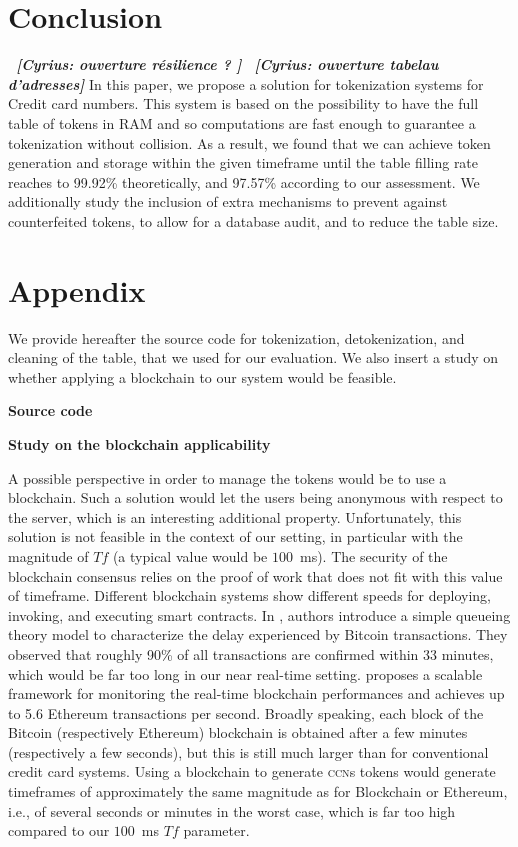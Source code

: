 \documentclass{llncs}
\newcommand{\cn}[1]{\emph{\bf \color{purple}~[Cyrius: #1]}}
\begin{document}
\section{Conclusion}\label{sect:conclu}

\cn{ouverture résilience ? }
\cn{ouverture tabelau d'adresses}
In this paper, we propose a solution for tokenization systems for Credit card numbers. This system is based on the possibility to have the full table of tokens in RAM and so computations are fast enough to guarantee a tokenization without collision. As a result, we found that we can achieve token generation and storage within the given timeframe until the table filling rate reaches to 99.92\% theoretically, and 97.57\% according to our assessment.
We additionally study the inclusion of extra mechanisms to prevent against counterfeited tokens, to allow for a database audit, and to reduce the table size.



\section*{Appendix}\label{appendix:code}

We provide hereafter the source code for tokenization, detokenization, and cleaning of the table, that we used for our evaluation. We also insert a study on whether applying a blockchain to our system would be feasible.

\textbf{Source code}


\textbf{Study on the blockchain applicability}

A possible perspective in order to manage the tokens would be to use a blockchain.
Such a solution would let the users being anonymous with respect to the server, which is an interesting additional property.
Unfortunately, this solution is not feasible in the context of our setting, in particular with the magnitude of $Tf$ (a typical value would be $100$~ms). The security of the blockchain consensus relies on the proof of work that does not fit with this value of timeframe. Different blockchain systems show different speeds for deploying, invoking, and executing smart contracts. In \cite{Ricci2019}, authors introduce a simple queueing theory model to characterize the delay experienced by Bitcoin transactions. They observed that roughly 90\% of all transactions are confirmed within 33 minutes, which would be far too long in our near real-time setting. \cite{Zheng2018} proposes a scalable framework for monitoring the real-time blockchain performances and achieves up to 5.6 Ethereum transactions per second. Broadly speaking, each block of the Bitcoin (respectively Ethereum) blockchain is obtained after a few minutes (respectively a few seconds), but this is still much larger than for conventional credit card systems. Using a blockchain to generate \textsc{ccn}s tokens would generate timeframes of approximately the same magnitude as for Blockchain or Ethereum, i.e., of several seconds or minutes in the worst case, which is far too high compared to our $100$~ms $Tf$ parameter.
\end{document}
